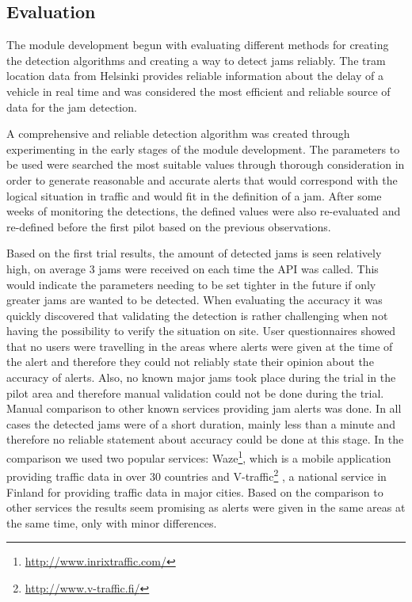 

\subsection{Evaluation}
The module development begun with evaluating different methods for
creating the detection algorithms and creating a way to detect jams
reliably. The tram location data from Helsinki provides reliable
information about the delay of a vehicle in real time and was
considered the most efficient and reliable source of data for the jam
detection.

A comprehensive and reliable detection algorithm was created through
experimenting in the early stages of the module development. The
parameters to be used were searched the most suitable values through
thorough consideration in order to generate reasonable and accurate
alerts that would correspond with the logical situation in traffic and
would fit in the definition of a jam. After some weeks of monitoring
the detections, the defined values were also re-evaluated and
re-defined before the first pilot based on the previous observations. 

Based on the first trial results, the amount of detected jams is seen
relatively high, on average 3 jams were received on each time the API
was called. This would indicate the parameters needing to be set
tighter in the future if only greater jams are wanted to be
detected. When evaluating the accuracy it was quickly discovered that
validating the detection is rather challenging when not having the
possibility to verify the situation on site. User questionnaires
showed that no users were travelling in the areas where alerts were
given at the time of the alert and therefore they could not reliably
state their opinion about the accuracy of alerts. Also, no known major
jams took place during the trial in the pilot area and therefore
manual validation could not be done during the trial. Manual
comparison to other known services providing jam alerts was done. In
all cases the detected jams were of a short duration, mainly less than
a minute and therefore no reliable statement about accuracy could be
done at this stage. In the comparison we used two popular services:
Waze\footnote{\url{http://www.inrixtraffic.com/}}, which is a mobile
application providing traffic data in over 30 countries and
V-traffic\footnote{\url{http://www.v-traffic.fi/}} , a national
service in Finland for providing traffic data in major cities. Based
on the comparison to other services the results seem promising as
alerts were given in the same areas at the same time, only with minor
differences.

